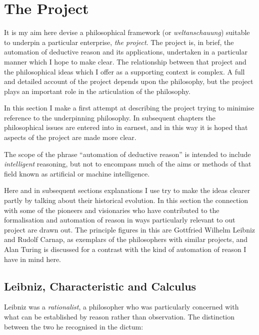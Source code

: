 \def\rbjidtheproject{$$Id: theproject.tex,v 1.2 2011/10/29 20:45:11 rbj Exp $$}

\section{The Project}\label{TheProject}

It is my aim here devise a philosophical framework (or \emph{weltanschauung}) suitable to underpin a particular enterprise, \emph{the project}.
The project is, in brief, the automation of deductive reason and its applications, undertaken in a particular manner which I hope to make clear.
The relationship between that project and the philosophical ideas which I offer as a supporting context is complex.
A full and detailed account of the project depends upon the philosophy, but the project plays an important role in the articulation of the philosophy.

In this section I make a first attempt at describing the project trying to minimise reference to the underpinning philosophy.
In subsequent chapters the philosophical issues are entered into in earnest, and in this way it is hoped that aspects of the project are made more clear.

The scope of the phrase ``automation of deductive reason'' is intended to include \emph{intelligent} reasoning, but not to encompass much of the aims or methods of that field known as artificial or machine intelligence.

Here and in subsequent sections explanations I use try to make the ideas clearer partly by talking about their historical evolution.
In this section the connection with some of the pioneers and visionaries who have contributed to the formalisation and automation of reason in ways particularly relevant to out project are drawn out.
The principle figures in this are Gottfried Wilhelm Leibniz and Rudolf Carnap, as exemplars of the philosophers with similar projects, and Alan Turing is discussed for a contrast with the kind of automation of reason I have in mind here.

\subsection{Leibniz, Characteristic and Calculus}

Leibniz was a \emph{rationalist}, a philosopher who was particularly concerned with what can be established by reason rather than observation.
The distinction between the two he recognised in the dictum:


